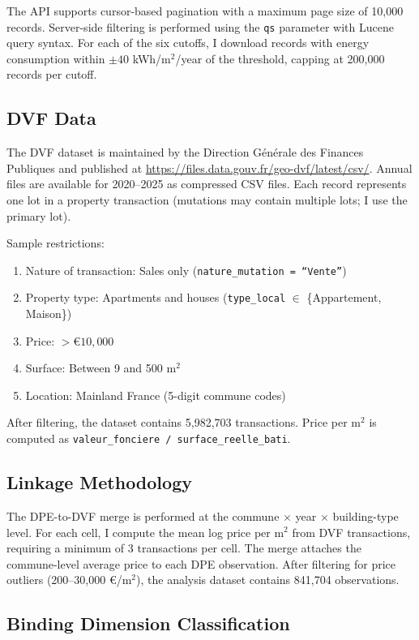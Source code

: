 \documentclass[12pt]{article}
\begin{document}
The API supports cursor-based pagination with a maximum page size of 10,000 records. Server-side filtering is performed using the \texttt{qs} parameter with Lucene query syntax. For each of the six cutoffs, I download records with energy consumption within $\pm 40$ kWh/m$^2$/year of the threshold, capping at 200,000 records per cutoff.

\subsection{DVF Data}

The DVF dataset is maintained by the Direction G\'en\'erale des Finances Publiques and published at \url{https://files.data.gouv.fr/geo-dvf/latest/csv/}. Annual files are available for 2020--2025 as compressed CSV files. Each record represents one lot in a property transaction (mutations may contain multiple lots; I use the primary lot).

Sample restrictions:
\begin{enumerate}
    \item Nature of transaction: Sales only (\texttt{nature\_mutation = ``Vente''})
    \item Property type: Apartments and houses (\texttt{type\_local} $\in$ \{Appartement, Maison\})
    \item Price: $> \euro 10{,}000$
    \item Surface: Between 9 and 500 m$^2$
    \item Location: Mainland France (5-digit commune codes)
\end{enumerate}

After filtering, the dataset contains 5,982,703 transactions. Price per m$^2$ is computed as \texttt{valeur\_fonciere / surface\_reelle\_bati}.

\subsection{Linkage Methodology}

The DPE-to-DVF merge is performed at the commune $\times$ year $\times$ building-type level. For each cell, I compute the mean log price per m$^2$ from DVF transactions, requiring a minimum of 3 transactions per cell. The merge attaches the commune-level average price to each DPE observation. After filtering for price outliers (200--30,000 \euro/m$^2$), the analysis dataset contains 841,704 observations.

\subsection{Binding Dimension Classification}
\end{document}
